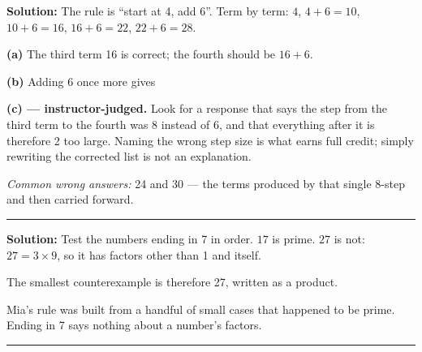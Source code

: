 \documentclass[12pt]{article}
\begin{document}




\textbf{Solution:} The rule is ``start at 4, add 6''. Term by term: $4$, $4+6=10$, $10+6=16$, $16+6=22$, $22+6=28$.

\textbf{(a)} The third term 16 is correct; the fourth should be $16+6$. 

\textbf{(b)} Adding 6 once more gives 

\textbf{(c) --- instructor-judged.} Look for a response that says the step from the third term to the fourth was 8 instead of 6, and that everything after it is therefore 2 too large. Naming the wrong step size is what earns full credit; simply rewriting the corrected list is not an explanation.

\emph{Common wrong answers:} 24 and 30 --- the terms produced by that single 8-step and then carried forward.

\vspace{0.2cm}\noindent\rule{\linewidth}{0.2pt}\vspace{0.2cm}


\textbf{Solution:} Test the numbers ending in 7 in order. $17$ is prime. $27$ is not: $27 = 3 \times 9$, so it has factors other than 1 and itself.

The smallest counterexample is therefore 27, written as a product. 

Mia's rule was built from a handful of small cases that happened to be prime. Ending in 7 says nothing about a number's factors.

\vspace{0.2cm}\noindent\rule{\linewidth}{0.2pt}\vspace{0.2cm}

\end{document}
